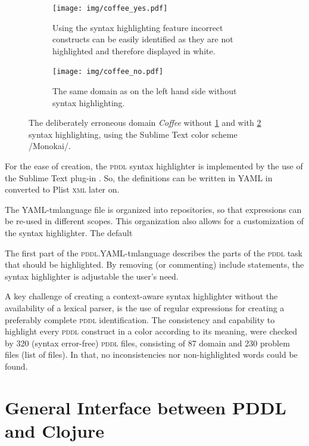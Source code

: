 \documentclass[a4paper,12pt]{report}
\newcommand{\pddl}{\textsc{pddl}\xspace}
\begin{document}
\begin{figure}
  \centering
  \begin{subfigure}[b]{0.49\textwidth}
    \texttt{[image: img/coffee\_yes.pdf]}
    \caption{Using the syntax highlighting feature incorrect
      constructs can be easily identified as they are not
      highlighted and therefore displayed in white.}
    \label{fig:sh-coffee-yes}
  \end{subfigure}
  \begin{subfigure}[b]{0.49\textwidth}
    \texttt{[image: img/coffee\_no.pdf]}
    \caption{The same domain as on the left hand side without syntax highlighting.}
    \label{fig:sh-coffee-no}
  \end{subfigure}%
\caption{The deliberately erroneous domain \emph{Coffee} without \ref{fig:sh-coffee-yes}
  and with \ref{fig:sh-coffee-no} syntax highlighting, using the Sublime Text color
  scheme /Monokai/.}
  \label{fig:syntax-highlighting}
\end{figure}


For the ease of creation, the \pddl syntax highlighter is implemented
by the use of the Sublime Text plug-in \textcite{aaapackagedev}. So,
the definitions can be written in YAML in converted to Plist
\textsc{xml} later on.

The YAML-tmlanguage file is organized into repositories, so that
expressions can be re-used in different scopes. This organization also
allows for a customization of the syntax highlighter. The default

The first part of the \pddl.YAML-tmlanguage describes the parts of the
\pddl task that should be highlighted. By removing (or commenting)
include statements, the syntax highlighter is adjustable the user's
need.

A key challenge of creating a context-aware syntax highlighter without
the availability of a lexical parser, is the use of regular
expressions for creating a preferably complete \pddl identification.
The consistency and capability to highlight every \pddl construct in a
color according to its meaning, were checked by 320 (syntax
error-free) \pddl files, consisting of 87 domain and 230 problem files
(list of files). In that, no inconsistencies nor non-highlighted words
could be found.
\section{General Interface between PDDL and Clojure}
\label{sec-4-4}
\end{document}
